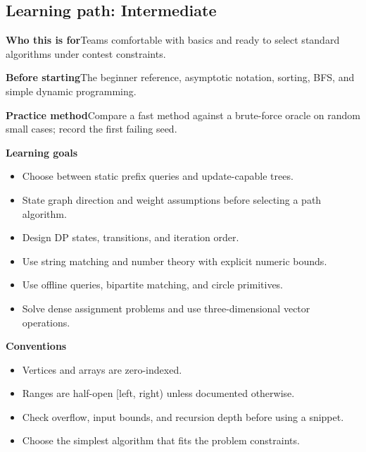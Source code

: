 \documentclass[10pt,letterpaper]{article}
\newcommand{\entrylabel}[1]{\textcolor{accent}{\bfseries #1}}
\begin{document}
\subsection*{Learning path: Intermediate}
\begin{guidebox}\entrylabel{Who this is for}\quad Teams comfortable with basics and ready to select standard algorithms under contest constraints.\par
\entrylabel{Before starting}\quad The beginner reference, asymptotic notation, sorting, BFS, and simple dynamic programming.\par
\entrylabel{Practice method}\quad Compare a fast method against a brute-force oracle on random small cases; record the first failing seed.\end{guidebox}
\textbf{Learning goals}\begin{itemize}
\item Choose between static prefix queries and update-capable trees.
\item State graph direction and weight assumptions before selecting a path algorithm.
\item Design DP states, transitions, and iteration order.
\item Use string matching and number theory with explicit numeric bounds.
\item Use offline queries, bipartite matching, and circle primitives.
\item Solve dense assignment problems and use three-dimensional vector operations.
\end{itemize}
\begin{guidebox}\textbf{Conventions}\begin{itemize}
\item Vertices and arrays are zero-indexed.
\item Ranges are half-open [left, right) unless documented otherwise.
\item Check overflow, input bounds, and recursion depth before using a snippet.
\item Choose the simplest algorithm that fits the problem constraints.
\end{itemize}\end{guidebox}
\end{document}
